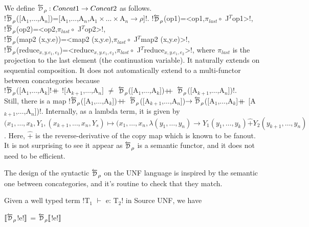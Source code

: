 \begin{definition}
    We define $\Dsynrevsymbol_{\rho}:\ConcatS\to\ConcatT$ as follows.\\
    !$\Dsynrevsymbol_{\rho}$([A$_1$,$\ldots$,A$_n$])=[A$_1$,$\ldots$,A$_n$,A$_1\times\ldots\times$A$_n\to \rho$]!.
    !$\Dsynrevsymbol_{\rho}$(op1)=<op1,$\pi_{last}\circ$ J$^T$op1>!,\\ 
    !$\Dsynrevsymbol_{\rho}$(op2)=<op2,$\pi_{last}\circ$ J$^T$op2>!,\\
    !$\Dsynrevsymbol_{\rho}$(map2 (x,y.e))=<map2 (x,y.e),$\pi_{last}\circ$ J$^T$map2 (x,y.e)>!,\\
    !$\Dsynrevsymbol_{\rho}$(reduce$_{x,y.e_1,e_2}$)=<reduce$_{x,y.e_1,e_2}$,$\pi_{last}\circ$ J$^T$reduce$_{x,y.e_1,e_2}$>!, 
    where $\pi_{last}$ is the projection to the last element (the continuation variable).
    It naturally extends on sequential composition. 
    It does not automatically extend to a multi-functor between concategories because \\
    !$\Dsynrevsymbol_{\rho}$([A$_1$,$\ldots$,A$_k$]!{$+\kern-1.3ex+\kern0.8ex$}![A$_{k+1}$,$\ldots$,A$_n$] $\neq$ $\Dsynrevsymbol_{\rho}$([A$_1$,$\ldots$,A$_k$])$\concatcomp\Dsynrevsymbol_{\rho}$([A$_{k+1}$,$\ldots$,A$_n$])!.\\
    Still, there is a map !$\Dsynrevsymbol_{\rho}$([A$_1$,$\ldots$,A$_k$])$\concatcomp \Dsynrevsymbol_{\rho}$([A$_{k+1}$,$\ldots$,A$_n$])$\to \Dsynrevsymbol_{\rho}$([A$_1$,$\ldots$,A$_k$]$+\kern-1.3ex+\kern0.8ex$[A$_{k+1}$,$\ldots$,A$_n$])!.
    Internally, as a lambda term, it is given by \\
    $(x_1,\ldots,x_k,Y_1,(x_{k+1},\ldots,x_n,Y_s)\mapsto (x_1,\ldots,x_n,\lambda(y_1,\ldots,y_n)\to Y_1(y_1,\ldots,y_k)\widehat{+}Y_2(y_{k+1},\ldots,y_n)$.
    Here, $\widehat{+}$ is the reverse-derivative of the copy map which is known to be fanout. 
    It is not surprising to see it appear as $\Dsynrevsymbol_{\rho}$ is a semantic functor, and it does not need to be efficient. 
\end{definition}

The design of the syntactic $\Dsynrevsymbol_{\rho}$ on the UNF language is inspired by the semantic one between concategories, 
and it's routine to check that they match. 

\begin{proposition}
    Given a well typed term !T$_1$ $\vdash$ e: T$_2$! in Source UNF, we have
    \begin{center}
        $\seml\Dsynrevsymbol_{\rho}$!e!$\rrbracket$ = $\Dsynrevsymbol_{\rho}\seml$!e!$\rrbracket$
    \end{center}
\end{proposition}


